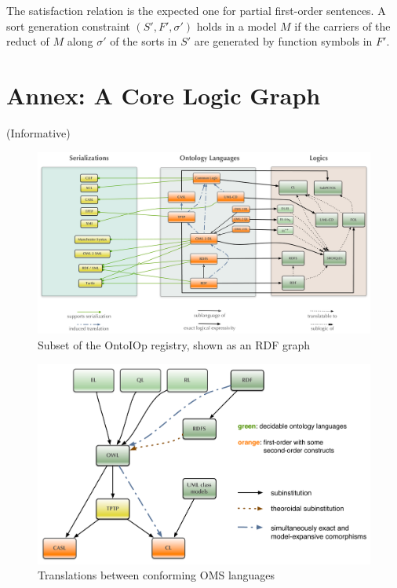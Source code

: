 \documentclass[10pt,fleqn,final]{scrreprt}
\newcommand{\informative}[0]{{\begin{center}{\Large{(Informative})}\end{center}} \bigskip}
\newcommand{\infannex}[1]{ \chapter{Annex: #1}  \informative }
\newenvironment{definitions}[0]{\medskip }{}
\begin{document}
\begin{definitions}
The satisfaction relation is the expected one for partial first-order sentences. A sort generation
constraint $(S', F', \sigma')$ holds in a model $M$ if the carriers of the reduct of $M$ along $\sigma'$ 
of the sorts in $S'$ are generated by function symbols in $F'$.

\infannex{A Core Logic Graph}\label{a:graph}


\begin{figure}
\centering
   \includegraphics[width=\textwidth]{illustrations/DOL-ontograph-layers-OMG} 
  \caption{Subset of the OntoIOp registry, shown as an RDF graph}
\label{f:DOL-threelayers}
\end{figure}


\begin{figure}
  \centering
  \includegraphics[width=\textwidth]{illustrations/ontograph-standards-new}
  \caption{Translations between conforming OMS languages}
  \label{fig:ontograph-standards}
\end{figure}


\end{definitions}
\end{document}

